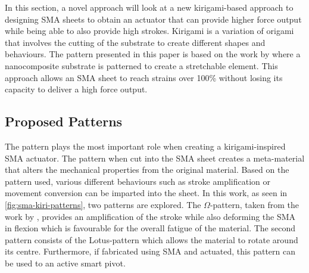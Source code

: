 In this section, a novel approach will look at a new kirigami-based approach to designing SMA sheets to obtain an actuator that can provide higher force output while being able to also provide high strokes. Kirigami is a variation of origami that involves the cutting of the substrate to create different shapes and behaviours. The pattern presented in this paper is based on the work by \cite{shyuKirigamiApproachEngineering2015} where a nanocomposite substrate is patterned to create a stretchable element. This approach allows an SMA sheet to reach strains over 100\% without losing its capacity to deliver a high force output.

\subsection{Proposed Patterns}
The pattern plays the most important role when creating a kirigami-inspired SMA actuator. The pattern when cut into the SMA sheet creates a meta-material that alters the mechanical properties from the original material. Based on the pattern used, various different behaviours such as stroke amplification or movement conversion can be imparted into the sheet. In this work, as seen in \cref{fig:sma-kiri-patterns}, two patterns are explored. The $\Omega$-pattern, taken from the work by \cite{shyuKirigamiApproachEngineering2015}, provides an amplification of the stroke while also deforming the SMA in flexion which is favourable for the overall fatigue of the material. The second pattern consists of the Lotus-pattern which allows the material to rotate around its centre. Furthermore, if fabricated using SMA and actuated, this pattern can be used to an active smart pivot.


